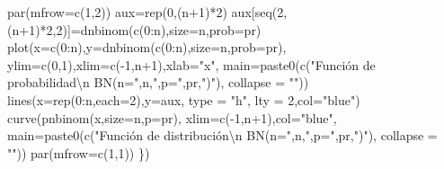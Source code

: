 \documentclass[
  letterpaper,
  DIV=11,
  numbers=noendperiod]{scrreprt}
\newenvironment{Shaded}{\begin{snugshade}}{\end{snugshade}}
\newcommand{\AttributeTok}[1]{\textcolor[rgb]{0.40,0.45,0.13}{#1}}
\newcommand{\DecValTok}[1]{\textcolor[rgb]{0.68,0.00,0.00}{#1}}
\newcommand{\FunctionTok}[1]{\textcolor[rgb]{0.28,0.35,0.67}{#1}}
\newcommand{\NormalTok}[1]{\textcolor[rgb]{0.00,0.23,0.31}{#1}}
\newcommand{\OtherTok}[1]{\textcolor[rgb]{0.00,0.23,0.31}{#1}}
\newcommand{\SpecialCharTok}[1]{\textcolor[rgb]{0.37,0.37,0.37}{#1}}
\newcommand{\StringTok}[1]{\textcolor[rgb]{0.13,0.47,0.30}{#1}}
\begin{document}
\begin{Shaded}
\begin{Highlighting}[]
  \FunctionTok{par}\NormalTok{(}\AttributeTok{mfrow=}\FunctionTok{c}\NormalTok{(}\DecValTok{1}\NormalTok{,}\DecValTok{2}\NormalTok{))}
\NormalTok{  aux}\OtherTok{=}\FunctionTok{rep}\NormalTok{(}\DecValTok{0}\NormalTok{,(n}\SpecialCharTok{+}\DecValTok{1}\NormalTok{)}\SpecialCharTok{*}\DecValTok{2}\NormalTok{)}
\NormalTok{  aux[}\FunctionTok{seq}\NormalTok{(}\DecValTok{2}\NormalTok{,(n}\SpecialCharTok{+}\DecValTok{1}\NormalTok{)}\SpecialCharTok{*}\DecValTok{2}\NormalTok{,}\DecValTok{2}\NormalTok{)]}\OtherTok{=}\FunctionTok{dnbinom}\NormalTok{(}\FunctionTok{c}\NormalTok{(}\DecValTok{0}\SpecialCharTok{:}\NormalTok{n),}\AttributeTok{size=}\NormalTok{n,}\AttributeTok{prob=}\NormalTok{pr)}
  \FunctionTok{plot}\NormalTok{(}\AttributeTok{x=}\FunctionTok{c}\NormalTok{(}\DecValTok{0}\SpecialCharTok{:}\NormalTok{n),}\AttributeTok{y=}\FunctionTok{dnbinom}\NormalTok{(}\FunctionTok{c}\NormalTok{(}\DecValTok{0}\SpecialCharTok{:}\NormalTok{n),}\AttributeTok{size=}\NormalTok{n,}\AttributeTok{prob=}\NormalTok{pr),}
       \AttributeTok{ylim=}\FunctionTok{c}\NormalTok{(}\DecValTok{0}\NormalTok{,}\DecValTok{1}\NormalTok{),}\AttributeTok{xlim=}\FunctionTok{c}\NormalTok{(}\SpecialCharTok{{-}}\DecValTok{1}\NormalTok{,n}\SpecialCharTok{+}\DecValTok{1}\NormalTok{),}\AttributeTok{xlab=}\StringTok{"x"}\NormalTok{,}
       \AttributeTok{main=}\FunctionTok{paste0}\NormalTok{(}\FunctionTok{c}\NormalTok{(}\StringTok{"Función de probabilidad}\SpecialCharTok{\textbackslash{}n}\StringTok{ BN(n="}\NormalTok{,n,}\StringTok{",p="}\NormalTok{,pr,}\StringTok{")"}\NormalTok{),}
                   \AttributeTok{collapse =} \StringTok{""}\NormalTok{))}
  \FunctionTok{lines}\NormalTok{(}\AttributeTok{x=}\FunctionTok{rep}\NormalTok{(}\DecValTok{0}\SpecialCharTok{:}\NormalTok{n,}\AttributeTok{each=}\DecValTok{2}\NormalTok{),}\AttributeTok{y=}\NormalTok{aux, }\AttributeTok{type =} \StringTok{"h"}\NormalTok{, }\AttributeTok{lty =} \DecValTok{2}\NormalTok{,}\AttributeTok{col=}\StringTok{"blue"}\NormalTok{)}
  \FunctionTok{curve}\NormalTok{(}\FunctionTok{pnbinom}\NormalTok{(x,}\AttributeTok{size=}\NormalTok{n,}\AttributeTok{p=}\NormalTok{pr),}
        \AttributeTok{xlim=}\FunctionTok{c}\NormalTok{(}\SpecialCharTok{{-}}\DecValTok{1}\NormalTok{,n}\SpecialCharTok{+}\DecValTok{1}\NormalTok{),}\AttributeTok{col=}\StringTok{"blue"}\NormalTok{,}
        \AttributeTok{main=}\FunctionTok{paste0}\NormalTok{(}\FunctionTok{c}\NormalTok{(}\StringTok{"Función de distribución}\SpecialCharTok{\textbackslash{}n}\StringTok{ BN(n="}\NormalTok{,n,}\StringTok{",p="}\NormalTok{,pr,}\StringTok{")"}\NormalTok{),}
                    \AttributeTok{collapse =} \StringTok{""}\NormalTok{))}
  \FunctionTok{par}\NormalTok{(}\AttributeTok{mfrow=}\FunctionTok{c}\NormalTok{(}\DecValTok{1}\NormalTok{,}\DecValTok{1}\NormalTok{))}
\NormalTok{\})}
\end{Highlighting}
\end{Shaded}
\end{document}
